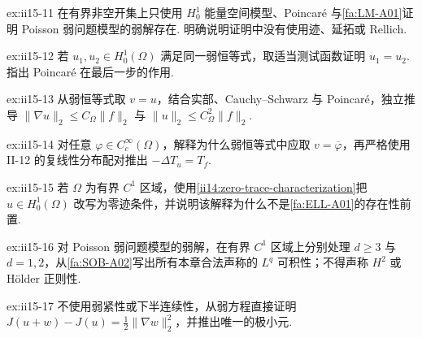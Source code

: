 \begin{FAExercise}{ex:ii15-11}
在有界非空开集上只使用 \(\displaystyle H_0^1\) 能量空间模型、Poincaré 与\autoref{fa:LM-A01}证明 Poisson 弱问题模型的弱解存在. 明确说明证明中没有使用迹、延拓或 Rellich.
\end{FAExercise}

\begin{FAExercise}{ex:ii15-12}
若 \(\displaystyle u_1,u_2\in H_0^1(\Omega)\) 满足同一弱恒等式，取适当测试函数证明 \(\displaystyle u_1=u_2\). 指出 Poincaré 在最后一步的作用.
\end{FAExercise}

\begin{FAExercise}{ex:ii15-13}
从弱恒等式取 \(\displaystyle v=u\)，结合实部、Cauchy--Schwarz 与 Poincaré，独立推导 \(\displaystyle\|\nabla u\|_2\leqslant C_\Omega\|f\|_2\) 与 \(\displaystyle\|u\|_2\leqslant C_\Omega^2\|f\|_2\).
\end{FAExercise}

\begin{FAExercise}[分布意义的识别]{ex:ii15-14}
对任意 \(\displaystyle\varphi\in C_c^\infty(\Omega)\)，解释为什么弱恒等式中应取 \(\displaystyle v=\overline\varphi\)，再严格使用 II-12 的复线性分布配对推出 \(\displaystyle-\Delta T_u=T_f\).
\end{FAExercise}

\begin{FAExercise}{ex:ii15-15}
若 \(\displaystyle\Omega\) 为有界 \(\displaystyle C^1\) 区域，使用\autoref{ii14:zero-trace-characterization}把 \(\displaystyle u\in H_0^1(\Omega)\) 改写为零迹条件，并说明该解释为什么不是\autoref{fa:ELL-A01}的存在性前置.
\end{FAExercise}

\begin{FAExercise}{ex:ii15-16}
对 Poisson 弱问题模型的弱解，在有界 \(\displaystyle C^1\) 区域上分别处理 \(\displaystyle d\geqslant3\) 与 \(\displaystyle d=1,2\)，从\autoref{fa:SOB-A02}写出所有本章合法声称的 \(\displaystyle L^q\) 可积性；不得声称 \(\displaystyle H^2\) 或 Hölder 正则性.
\end{FAExercise}

\begin{FAExercise}{ex:ii15-17}
不使用弱紧性或下半连续性，从弱方程直接证明 \(\displaystyle J(u+w)-J(u)=\frac12\|\nabla w\|_2^2\)，并推出唯一的极小元.
\end{FAExercise}

